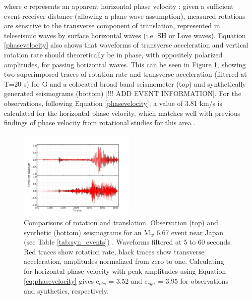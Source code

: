 \documentclass{gji}
\begin{document}
\noindent where c represents an apparent horizontal phase velocity \cite{igel2005rotational}; given a sufficient event-receiver distance (allowing a plane wave assumption), measured rotations are sensitive to the transverse component of translation, represented in teleseismic waves by surface horizontal waves (i.e. SH or Love waves). Equation \ref{phasevelocity} also shows that waveforms of transverse acceleration and vertical rotation rate should theoretically be in phase, with oppositely polarized amplitudes, for passing horizontal waves. This can be seen in Figure \ref{fig:rr_ta}, showing two superimposed traces of rotation rate and transverse acceleration (filtered at T=20 s) for G and a colocated broad band seismometer (top) and synthetically generated seismograms (bottom) [!!! ADD EVENT INFORMATION]. For the observations, following Equation \ref{phasevelocity}, a value of 3.81 km/s is calculated for the horizontal phase velocity, which matches well with previous findings of phase velocity from rotational studies for this area \cite{igel2007broad}.



\begin{figure}
\centerline{\includegraphics[width=0.5\textwidth]{C201109161926A_phmatch}}
\caption{Comparisons of rotation and translation. Observation (top) and synthetic (bottom) seismograms for an M$_w$ 6.67 event near Japan (see Table \ref{tab:syn_events}) . Waveforms filtered at 5 to 60 seconds. Red traces show rotation rate, black traces show transverse acceleration, amplitudes normalized from zero to one. Calculating for horizontal phase velocity with peak amplitudes using Equation \ref{eq:phasevelocity} gives c$_{obs}$ = 3.52 and c$_{syn}$ = 3.95 for observations and synthetics, respectively.}
\label{fig:rr_ta}
\end{figure}
\end{document}
